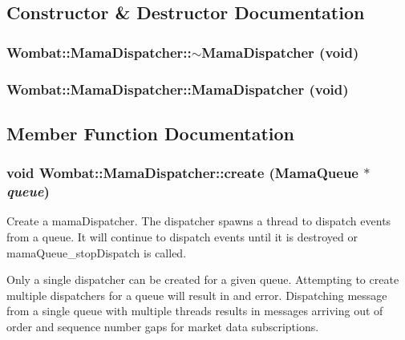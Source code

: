 \subsection{Constructor \& Destructor Documentation}
\hypertarget{classWombat_1_1MamaDispatcher_a3a997e7754864628bbd644d6536cffba}{
\subsubsection[{$\sim$MamaDispatcher}]{\setlength{\rightskip}{0pt plus 5cm}Wombat::MamaDispatcher::$\sim$MamaDispatcher (void)}}
\label{classWombat_1_1MamaDispatcher_a3a997e7754864628bbd644d6536cffba}
\hypertarget{classWombat_1_1MamaDispatcher_a5942bec14afa1fd102d3e87fa2f04202}{
\subsubsection[{MamaDispatcher}]{\setlength{\rightskip}{0pt plus 5cm}Wombat::MamaDispatcher::MamaDispatcher (void)}}
\label{classWombat_1_1MamaDispatcher_a5942bec14afa1fd102d3e87fa2f04202}


\subsection{Member Function Documentation}
\hypertarget{classWombat_1_1MamaDispatcher_a0e06030055142e7c6f576a560a17f3b9}{
\subsubsection[{create}]{\setlength{\rightskip}{0pt plus 5cm}void Wombat::MamaDispatcher::create ({\bf MamaQueue} $\ast$ {\em queue})}}
\label{classWombat_1_1MamaDispatcher_a0e06030055142e7c6f576a560a17f3b9}


Create a mamaDispatcher. The dispatcher spawns a thread to dispatch events from a queue. It will continue to dispatch events until it is destroyed or mamaQueue\_\-stopDispatch is called.

Only a single dispatcher can be created for a given queue. Attempting to create multiple dispatchers for a queue will result in and error. Dispatching message from a single queue with multiple threads results in messages arriving out of order and sequence number gaps for market data subscriptions.


